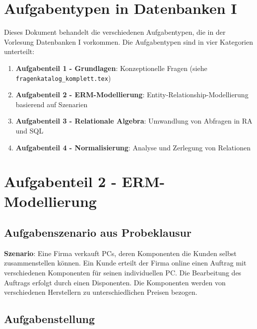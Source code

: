 \documentclass[a4paper]{article}
\title{\docTitle}
\author{Moritz}
\date{\today}
\begin{document}
\maketitle

\tableofcontents
\newpage

\section{Aufgabentypen in Datenbanken I}

Dieses Dokument behandelt die verschiedenen Aufgabentypen, die in der Vorlesung Datenbanken I vorkommen.
Die Aufgabentypen sind in vier Kategorien unterteilt:

\begin{enumerate}
    \item \textbf{Aufgabenteil 1 - Grundlagen}: Konzeptionelle Fragen (siehe \texttt{fragenkatalog\_komplett.tex})
    \item \textbf{Aufgabenteil 2 - ERM-Modellierung}: Entity-Relationship-Modellierung basierend auf Szenarien
    \item \textbf{Aufgabenteil 3 - Relationale Algebra}: Umwandlung von Abfragen in RA und SQL
    \item \textbf{Aufgabenteil 4 - Normalisierung}: Analyse und Zerlegung von Relationen
\end{enumerate}

\newpage

\section{Aufgabenteil 2 - ERM-Modellierung}

\subsection{Aufgabenszenario aus Probeklausur}

\textbf{Szenario}: Eine Firma verkauft PCs, deren Komponenten die Kunden selbst zusammenstellen können. 
Ein Kunde erteilt der Firma online einen Auftrag mit verschiedenen Komponenten für seinen individuellen PC. 
Die Bearbeitung des Auftrags erfolgt durch einen Disponenten. 
Die Komponenten werden von verschiedenen Herstellern zu unterschiedlichen Preisen bezogen.

\subsection{Aufgabenstellung}
\end{document}
